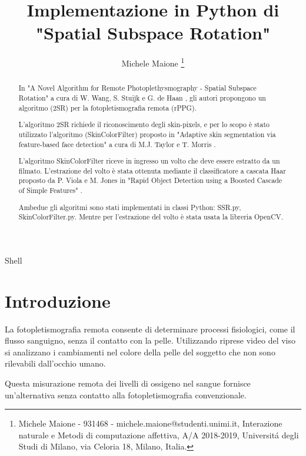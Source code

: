 \documentclass[journal,A4paper,compsoc,epsfig]{IEEEtran}
\begin{document}
  \title{Implementazione in Python di "Spatial Subspace Rotation"}
  \author{Michele Maione \thanks{Michele Maione - 931468 - michele.maione@studenti.unimi.it, Interazione naturale e Metodi di computazione affettiva, A/A 2018-2019, Universitá degli Studi di Milano, via Celoria 18, Milano, Italia.}}
  {Shell}
  \maketitle

  \begin{abstract}
    In "A Novel Algorithm for Remote Photoplethysmography - Spatial Subspace Rotation" a cura di W. Wang, S. Stuijk e G. de Haan \cite{wang-tbe-2016}, gli autori propongono un algoritmo (2SR) per la fotopletismografia remota (rPPG).
    
    L'algoritmo 2SR richiede il riconoscimento degli skin-pixels, e per lo scopo è stato utilizzato l'algoritmo (SkinColorFilter) proposto in "Adaptive skin segmentation via feature-based face detection" a cura di M.J. Taylor e T. Morris \cite{adaptive_skin_segmentation}.
    
    L'algoritmo SkinColorFilter riceve in ingresso un volto che deve essere estratto da un filmato.
    L'estrazione del volto è stata ottenuta mediante il classificatore a cascata Haar proposto da P. Viola e M. Jones in "Rapid Object Detection using a Boosted Cascade of Simple Features" \cite{skin_color_filter}.
    
    Ambedue gli algoritmi sono stati implementati in classi Python: SSR.py, SkinColorFilter.py. Mentre per l'estrazione del volto è stata usata la libreria OpenCV.
  \end{abstract}

  \section{Introduzione}
    \label{sec:Introduzione}
    La fotopletismografia remota consente di determinare processi fisiologici, come il flusso sanguigno, senza il contatto con la pelle.
    Utilizzando riprese video del viso si analizzano i cambiamenti nel colore della pelle del soggetto che non sono rilevabili dall'occhio umano.
    
    Questa misurazione remota dei livelli di ossigeno nel sangue fornisce un'alternativa senza contatto alla fotopletismografia convenzionale.
    
\end{document}
